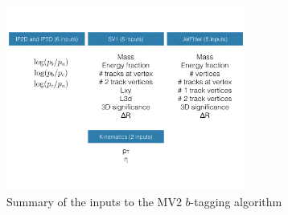 \begin{figure}[h!]
  \centering
  \captionsetup{justification=centering}

  \includegraphics[width=0.7\textwidth]{figures/MV2_inputs}
  \caption{Summary of the inputs to the MV2 $b$-tagging algorithm}
  \label{fig:MV2inputs}
\end{figure}

